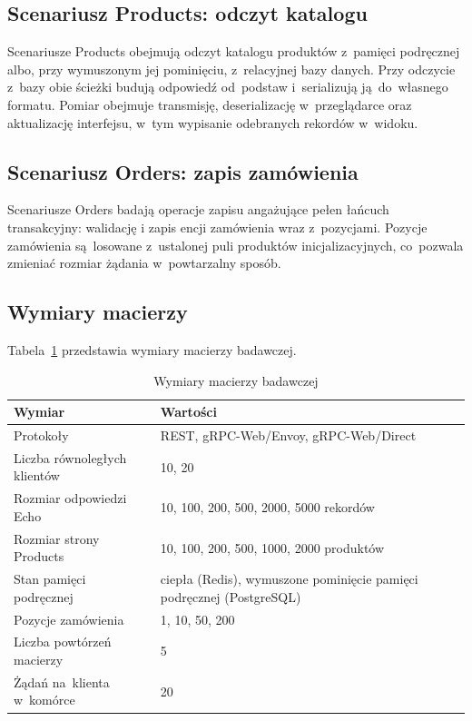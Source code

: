 \subsection{Scenariusz Products: odczyt katalogu}
\label{subsec:ScenariuszProducts}

Scenariusze Products obejmują odczyt katalogu produktów z~pamięci podręcznej albo, przy wymuszonym jej pominięciu, z~relacyjnej bazy danych. Przy odczycie z~bazy obie ścieżki budują odpowiedź od~podstaw i~serializują ją~do~własnego formatu. Pomiar obejmuje transmisję, deserializację w~przeglądarce oraz aktualizację interfejsu, w~tym wypisanie odebranych rekordów w~widoku.

\subsection{Scenariusz Orders: zapis zamówienia}
\label{subsec:ScenariuszOrders}

Scenariusze Orders badają operacje zapisu angażujące pełen łańcuch transakcyjny: walidację i zapis encji zamówienia wraz z~pozycjami. Pozycje zamówienia są~losowane z~ustalonej puli produktów inicjalizacyjnych, co~pozwala zmieniać rozmiar żądania w~powtarzalny sposób.

\subsection{Wymiary macierzy}
\label{subsec:WymiaryMacierzy}

Tabela~\ref{tab:MacierzBadawcza} przedstawia wymiary macierzy badawczej.

\begin{table}[htb]
\centering
\footnotesize
\caption{Wymiary macierzy badawczej}
\label{tab:MacierzBadawcza}
\begin{tabular}{|l|p{7.4cm}|}
\hline
\textbf{Wymiar} & \textbf{Wartości} \\
\hline
Protokoły & REST, gRPC-Web/Envoy, gRPC-Web/Direct \\
Liczba równoległych klientów & 10, 20 \\
Rozmiar odpowiedzi Echo & 10, 100, 200, 500, 2000, 5000 rekordów \\
Rozmiar strony Products & 10, 100, 200, 500, 1000, 2000 produktów \\
Stan pamięci podręcznej & ciepła (Redis), wymuszone pominięcie pamięci podręcznej (PostgreSQL) \\
Pozycje zamówienia & 1, 10, 50, 200 \\
Liczba powtórzeń macierzy & 5 \\
Żądań na~klienta w~komórce & 20 \\
\hline
\end{tabular}
\end{table}

